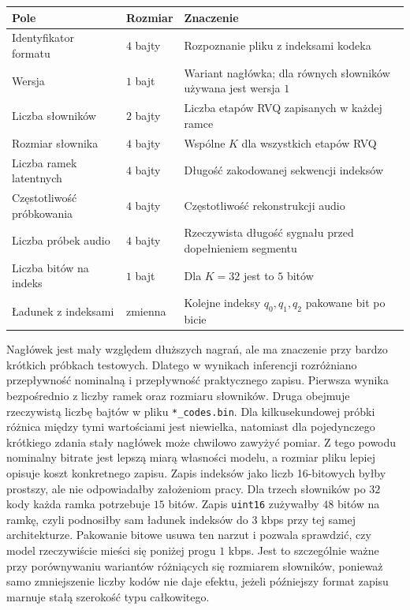 \begin{center}
\centering
\small
\begin{tabular}{>{\raggedright\arraybackslash}p{} >{\raggedright\arraybackslash}p{} >{\raggedright\arraybackslash}p{}}
\toprule
Pole & Rozmiar & Znaczenie \\
\midrule
Identyfikator formatu & \(4\) bajty & Rozpoznanie pliku z indeksami kodeka \\
Wersja & \(1\) bajt & Wariant nagłówka; dla równych słowników używana jest wersja \(1\) \\
Liczba słowników & \(2\) bajty & Liczba etapów RVQ zapisanych w każdej ramce \\
Rozmiar słownika & \(4\) bajty & Wspólne \(K\) dla wszystkich etapów RVQ \\
Liczba ramek latentnych & \(4\) bajty & Długość zakodowanej sekwencji indeksów \\
Częstotliwość próbkowania & \(4\) bajty & Częstotliwość rekonstrukcji audio \\
Liczba próbek audio & \(4\) bajty & Rzeczywista długość sygnału przed dopełnieniem segmentu \\
Liczba bitów na indeks & \(1\) bajt & Dla \(K=32\) jest to \(5\) bitów \\
Ładunek z indeksami & zmienna & Kolejne indeksy \(q_0,q_1,q_2\) pakowane bit po bicie \\
\bottomrule
\end{tabular}
\label{tab:format-codes-bin}
\end{center}

Nagłówek jest mały względem dłuższych nagrań, ale ma znaczenie przy bardzo krótkich próbkach testowych. Dlatego w wynikach inferencji rozróżniano przepływność nominalną i przepływność praktycznego zapisu. Pierwsza wynika bezpośrednio z liczby ramek oraz rozmiaru słowników. Druga obejmuje rzeczywistą liczbę bajtów w pliku \texttt{*\_codes.bin}. Dla kilkusekundowej próbki różnica między tymi wartościami jest niewielka, natomiast dla pojedynczego krótkiego zdania stały nagłówek może chwilowo zawyżyć pomiar. Z tego powodu nominalny bitrate jest lepszą miarą własności modelu, a rozmiar pliku lepiej opisuje koszt konkretnego zapisu. Zapis indeksów jako liczb 16-bitowych byłby prostszy, ale nie odpowiadałby założeniom pracy. Dla trzech słowników po \(32\) kody każda ramka potrzebuje \(15\) bitów. Zapis \texttt{uint16} zużywałby \(48\) bitów na ramkę, czyli podnosiłby sam ładunek indeksów do \(3\) kbps przy tej samej architekturze. Pakowanie bitowe usuwa ten narzut i pozwala sprawdzić, czy model rzeczywiście mieści się poniżej progu \(1\) kbps. Jest to szczególnie ważne przy porównywaniu wariantów różniących się rozmiarem słowników, ponieważ samo zmniejszenie liczby kodów nie daje efektu, jeżeli późniejszy format zapisu marnuje stałą szerokość typu całkowitego.

